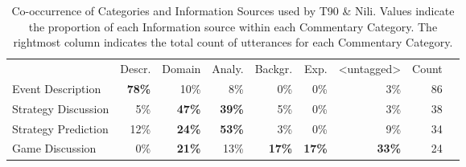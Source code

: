 \begin{table}[htbp]
  \caption{Co-occurrence of Categories and Information Sources used by T90 \& Nili. Values indicate the proportion of each Information source within each Commentary Category. The rightmost column indicates the total count of utterances for each Commentary Category.}
  \label{tab:co-occurrence-type-source}
  \begin{tabular}{lrrrrrrrr}
    & Descr. & Domain & Analy. & Backgr. & Exp. & \textless{}untagged\textgreater{} & Count &  \\
    Event Description                 & \textbf{78\%}                                                                           & 10\%                                                                      & 8\%                                                                           & 0\%                                                                           & 0\%                                                                             & 3\%                                                                                                  & 86                                                                       \\
    Strategy Discussion               & 5\%                                                                            & \textbf{47\%}                                                                      & \textbf{39\%}                                                                          & 5\%                                                                           & 0\%                                                                             & 3\%                                                                                                  & 38                                                                       \\
    Strategy Prediction               & 12\%                                                                           & \textbf{24\%}                                                                      & \textbf{53\%}                                                                          & 3\%                                                                           & 0\%                                                                             & 9\%                                                                                                  & 34                                                                       \\
    Game Discussion                   & 0\%                                                                            & \textbf{21\%}                                                                      & 13\%                                                                          & \textbf{17\%}                                                                          & \textbf{17\%}                                                                            & \textbf{33\%}                                                                                                 & 24                                                                       \\

\end{tabular}
\end{table}
